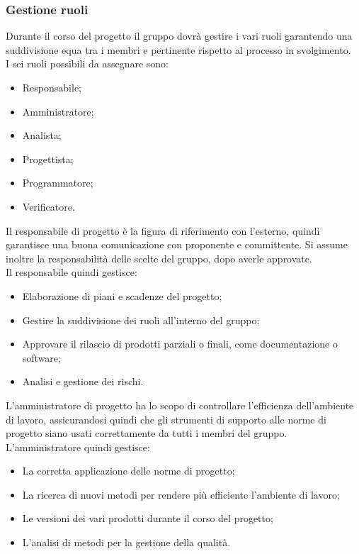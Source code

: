 	\subsubsection{Gestione ruoli}
	Durante il corso del progetto il gruppo dovrà gestire i vari ruoli garantendo una suddivisione equa tra i membri e pertinente rispetto al processo in svolgimento.\\
	I sei ruoli possibili da assegnare sono:
    \begin{itemize}
    	\item Responsabile;
    	\item Amministratore;
    	\item Analista;
    	\item Progettista;
    	\item Programmatore;
    	\item Verificatore.
    \end{itemize}
	Il responsabile di progetto è la figura di riferimento con l'esterno, quindi  garantisce una buona comunicazione con proponente e committente. Si assume inoltre la responsabilità delle scelte del gruppo, dopo averle approvate.\\
	Il responsabile quindi gestisce:
	\begin{itemize}
		\item Elaborazione di piani e scadenze del progetto;
		\item Gestire la suddivisione dei ruoli all'interno del gruppo;
		\item Approvare il rilascio di prodotti parziali o finali, come documentazione o software;
		\item Analisi e gestione dei rischi.
	\end{itemize}
	L'amministratore di progetto ha lo scopo di controllare l'efficienza dell'ambiente di lavoro, assicurandosi quindi che gli strumenti di supporto alle norme di progetto siano usati correttamente da tutti i membri del gruppo.\\
	L'amministratore quindi gestisce:
	\begin{itemize}
		\item La corretta applicazione delle norme di progetto;
		\item La ricerca di nuovi metodi per rendere più efficiente l'ambiente di lavoro;
		\item Le versioni dei vari prodotti durante il corso del progetto;
		\item L'analisi di metodi per la gestione della qualità.
	\end{itemize}
